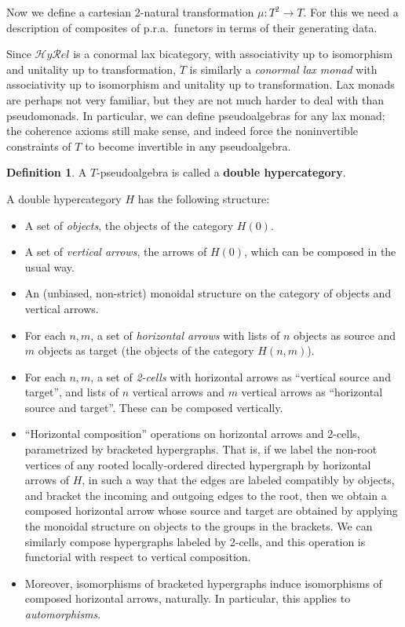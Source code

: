 \documentclass{article}
\theoremstyle{definition}
\newtheorem{defn}[thm]{Definition}
\theoremstyle{remark}
\def\hyrel{\mathcal{H}\mathit{y}\mathcal{R}\mathit{el}}
\begin{document}
Now we define a cartesian 2-natural transformation $\mu:T^2\to T$.
For this we need a description of composites of p.r.a.\ functors in terms of their generating data.

Since $\hyrel$ is a conormal lax bicategory, with associativity up to isomorphism and unitality up to transformation, $T$ is similarly a \emph{conormal lax monad} with associativity up to isomorphism and unitality up to transformation.
Lax monads are perhaps not very familiar, but they are not much harder to deal with than pseudomonads.
In particular, we can define pseudoalgebras for any lax monad; the coherence axioms still make sense, and indeed force the noninvertible constraints of $T$ to become invertible in any pseudoalgebra.

\begin{defn}
  A $T$-pseudoalgebra is called a \textbf{double hypercategory}.
\end{defn}

A double hypercategory $H$ has the following structure:
\begin{itemize}
\item A set of \emph{objects}, the objects of the category $H(0)$.
\item A set of \emph{vertical arrows}, the arrows of $H(0)$, which can be composed in the usual way.
\item An (unbiased, non-strict) monoidal structure on the category of objects and vertical arrows.
\item For each $n,m$, a set of \emph{horizontal arrows} with lists of $n$ objects as source and $m$ objects as target (the objects of the category $H(n,m)$).
\item For each $n,m$, a set of \emph{2-cells} with horizontal arrows as ``vertical source and target'', and lists of $n$ vertical arrows and $m$ vertical arrows as ``horizontal source and target''.
  These can be composed vertically.
\item ``Horizontal composition'' operations on horizontal arrows and 2-cells, parametrized by bracketed hypergraphs.
  That is, if we label the non-root vertices of any rooted locally-ordered directed hypergraph by horizontal arrows of $H$, in such a way that the edges are labeled compatibly by objects, and bracket the incoming and outgoing edges to the root, then we obtain a composed horizontal arrow whose source and target are obtained by applying the monoidal structure on objects to the groups in the brackets.
  We can similarly compose hypergraphs labeled by 2-cells, and this operation is functorial with respect to vertical composition.
\item Moreover, isomorphisms of bracketed hypergraphs induce isomorphisms of composed horizontal arrows, naturally.
  In particular, this applies to \emph{automorphisms}.
\end{itemize}
\end{document}
